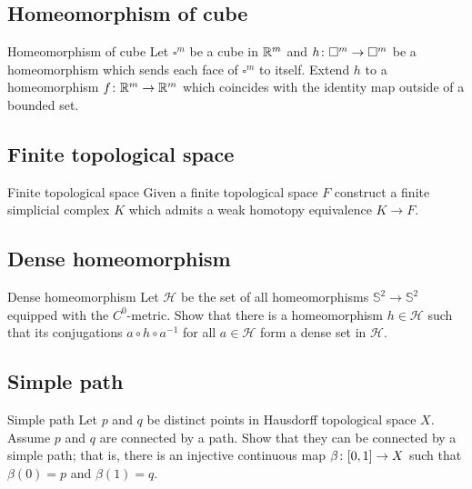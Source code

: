 \subsection*{Homeomorphism of cube}

\begin{pr}{}{Homeomorphism of cube}\label{Homeomorphism of cube}
Let $\square^m$ be a cube in $\mathbb{R}^m$
and $h\:\square^m\z\to\square^m$ be
a homeomorphism which sends each face of $\square^m$ to itself.
Extend $h$ to a homeomorphism $f\colon\mathbb{R}^m\to\mathbb{R}^m$ which coincides with the identity map outside of a bounded set.    
\end{pr}

\subsection*{Finite topological space\easy}


\begin{pr}{\easy}{Finite topological space}\label{Finite topological space}
Given a finite topological space $F$ 
construct a finite simplicial complex $K$
which admits a weak homotopy equivalence  $K\to F$. 
\end{pr}

\subsection*{Dense homeomorphism\easy}

\begin{pr}{\easy}{Dense homeomorphism}\label{Dense homeomorphism}
Let $\mathcal{H}$ be the set of all homeomorphisms $\mathbb {S}^2\to\mathbb {S}^2$ 
equipped with the $C^0$-metric.
Show that there is a homeomorphism $h\in \mathcal{H}$ such that its conjugations $a\circ h\circ a^{-1}$ for all $a\in\mathcal{H}$ form a dense set in $\mathcal{H}$.
 
\end{pr}

\subsection*{Simple path\easy}


\begin{pr}{\easy}{Simple path}\label{Simple path}
Let $p$ and $q$ be distinct points in Hausdorff topological space $X$.
Assume $p$ and $q$ are connected by a path.
Show that they can be connected by a simple path;
that is, there is an injective continuous map $\beta\:[0,1]\z\to X$
such that $\beta(0)=p$ and $\beta(1)=q$.
\end{pr}







